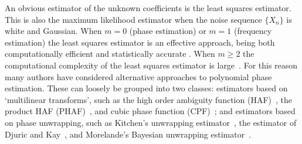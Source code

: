 \documentclass[journal]{IEEEtran}
\begin{document}
An obvious estimator of the unknown coefficients is the least squares estimator.  This is also the maximum likelihood estimator when the noise sequence $\{X_n\}$ is white and Gaussian.  When $m=0$ (phase estimation) or $m=1$ (frequency estimation) the least squares estimator is an effective approach, being both computationally efficient and statistically accurate \cite{Quinn2009_dasp_phase_only_information_loss,Hannan1973,Quinn2001,McKilliam_mean_dir_est_sq_arc_length2010,McKilliam2010thesis}. When $m \geq 2$ the computational complexity of the least squares estimator is large~\cite{Oshea_cpf_2004,McKilliam2010thesis,Abatzoglou_ml_chirp_1986}. For this reason many authors have considered alternative approaches to polynomial phase estimation. These can loosely be grouped into two classes: estimators based on `multilinear transforms', such as the high order ambiguity function (HAF)~\cite{Peleg_DPT_1995,Peleg1991_est_class_PPS_1991,Porat_asympt_HAF_DPT_1996,Farquharson_another_poly_est_2005,Boashash_Oshea_1994,Barbarossa_analysis_of_PPS_1997}, the product HAF (PHAF)~\cite{Barbarossa_PHAF_1998}, and cubic phase function (CPF)~\cite{Oshea_cpf_2004,Oshea_cpf_2002_letter,Djurovic_haf_cpf_2012,OShea_new_class_multilinear_2009}; and estimators based on phase unwrapping, such as Kitchen's unwrapping estimator~\cite{Kitchen_polyphase_unwrapping_1994}, the estimator of Djuric and Kay~\cite{Djuric_phase_unwrap_chirp_1990}, and Morelande's Bayesian unwrapping estimator~\cite{Morelande_bayes_unwrapping_2009_tsp}.
\end{document}

